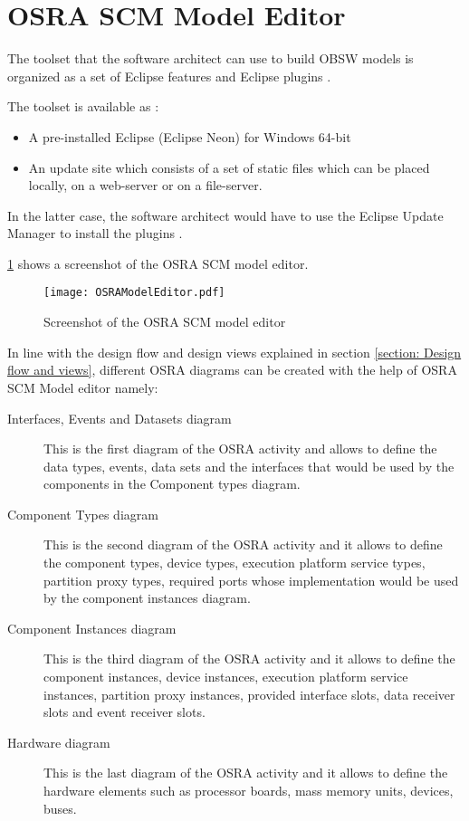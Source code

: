 \section{OSRA SCM Model Editor}
\label{section: OSRA editor} 
The toolset that the software architect can use to build OBSW models is organized as a set of Eclipse features and Eclipse plugins \cite{OSRAEditor}. 

The toolset is available as \cite{OSRAEditor}:
\begin{itemize}
\item A pre-installed Eclipse (Eclipse Neon) for Windows 64-bit  
\item An update site which consists of a set of static files which can be placed locally, on a web-server or on a file-server. 
\end{itemize}
In the latter case, the software architect would have to use the Eclipse Update Manager to install the plugins \cite{OSRAEditor}. 

\cref{fig: OSRA model editor} shows a screenshot of the OSRA SCM model editor.

\begin{figure}[h]
	\centering
	\texttt{[image: OSRAModelEditor.pdf]}
	\caption{Screenshot of the OSRA SCM model editor}
	\label{fig: OSRA model editor}
\end{figure}

In line with the design flow and design views explained in section \cref{section: Design flow and views}, different OSRA diagrams can be created with the help of OSRA SCM Model editor namely:
\begin{description}
\item [Interfaces, Events and Datasets diagram] This is the first diagram of the OSRA activity and allows to define the data types, events, data sets and the interfaces that would be used by the components in the Component types diagram.
\item [Component Types diagram] This is the second diagram of the OSRA activity and it allows to define the component types, device types, execution platform service types, partition proxy types, required ports whose implementation would be used by the component instances diagram.
\item [Component Instances diagram] This is the third diagram of the OSRA activity and it allows to define the component instances, device instances, execution platform service instances, partition proxy instances, provided interface slots, data receiver slots and event receiver slots.
\item [Hardware diagram] This is the last diagram of the OSRA activity and it allows to define the hardware elements such as processor boards, mass memory units, devices, buses.
\end{description}

